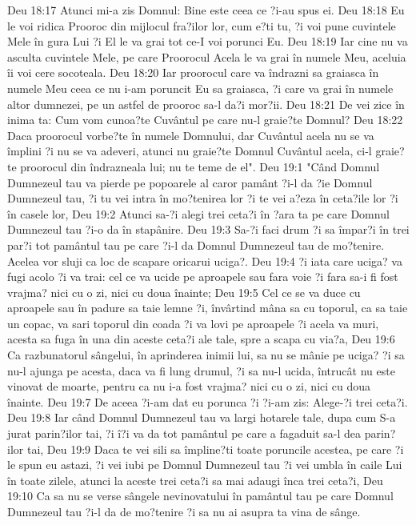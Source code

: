 Deu 18:17  Atunci mi-a zis Domnul: Bine este ceea ce ?i-au spus ei.
Deu 18:18  Eu le voi ridica Prooroc din mijlocul fra?ilor lor, cum e?ti tu, ?i voi pune cuvintele Mele în gura Lui ?i El le va grai tot ce-I voi porunci Eu.
Deu 18:19  Iar cine nu va asculta cuvintele Mele, pe care Proorocul Acela le va grai în numele Meu, aceluia îi voi cere socoteala.
Deu 18:20  Iar proorocul care va îndrazni sa graiasca în numele Meu ceea ce nu i-am poruncit Eu sa graiasca, ?i care va grai în numele altor dumnezei, pe un astfel de prooroc sa-l da?i mor?ii.
Deu 18:21  De vei zice în inima ta: Cum vom cunoa?te Cuvântul pe care nu-l graie?te Domnul?
Deu 18:22  Daca proorocul vorbe?te în numele Domnului, dar Cuvântul acela nu se va împlini ?i nu se va adeveri, atunci nu graie?te Domnul Cuvântul acela, ci-l graie?te proorocul din îndrazneala lui; nu te teme de el".
Deu 19:1  "Când Domnul Dumnezeul tau va pierde pe popoarele al caror pamânt ?i-l da ?ie Domnul Dumnezeul tau, ?i tu vei intra în mo?tenirea lor ?i te vei a?eza în ceta?ile lor ?i în casele lor,
Deu 19:2  Atunci sa-?i alegi trei ceta?i în ?ara ta pe care Domnul Dumnezeul tau ?i-o da în stapânire.
Deu 19:3  Sa-?i faci drum ?i sa împar?i în trei par?i tot pamântul tau pe care ?i-l da Domnul Dumnezeul tau de mo?tenire. Acelea vor sluji ca loc de scapare oricarui uciga?.
Deu 19:4  ?i iata care uciga? va fugi acolo ?i va trai: cel ce va ucide pe aproapele sau fara voie ?i fara sa-i fi fost vrajma? nici cu o zi, nici cu doua înainte;
Deu 19:5  Cel ce se va duce cu aproapele sau în padure sa taie lemne ?i, învârtind mâna sa cu toporul, ca sa taie un copac, va sari toporul din coada ?i va lovi pe aproapele ?i acela va muri, acesta sa fuga în una din aceste ceta?i ale tale, spre a scapa cu via?a,
Deu 19:6  Ca razbunatorul sângelui, în aprinderea inimii lui, sa nu se mânie pe uciga? ?i sa nu-l ajunga pe acesta, daca va fi lung drumul, ?i sa nu-l ucida, întrucât nu este vinovat de moarte, pentru ca nu i-a fost vrajma? nici cu o zi, nici cu doua înainte.
Deu 19:7  De aceea ?i-am dat eu porunca ?i ?i-am zis: Alege-?i trei ceta?i.
Deu 19:8  Iar când Domnul Dumnezeul tau va largi hotarele tale, dupa cum S-a jurat parin?ilor tai, ?i î?i va da tot pamântul pe care a fagaduit sa-l dea parin?ilor tai,
Deu 19:9  Daca te vei sili sa împline?ti toate poruncile acestea, pe care ?i le spun eu astazi, ?i vei iubi pe Domnul Dumnezeul tau ?i vei umbla în caile Lui în toate zilele, atunci la aceste trei ceta?i sa mai adaugi înca trei ceta?i,
Deu 19:10  Ca sa nu se verse sângele nevinovatului în pamântul tau pe care Domnul Dumnezeul tau ?i-l da de mo?tenire ?i sa nu ai asupra ta vina de sânge.
